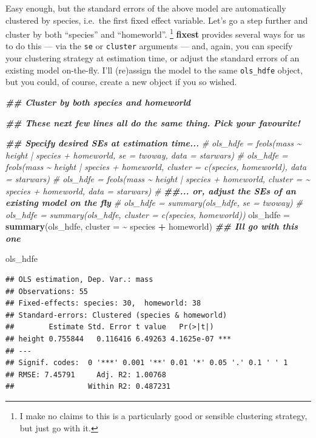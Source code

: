 \documentclass[
]{article}
\newenvironment{Shaded}{\begin{snugshade}}{\end{snugshade}}
\newcommand{\AttributeTok}[1]{\textcolor[rgb]{0.13,0.29,0.53}{#1}}
\newcommand{\CommentTok}[1]{\textcolor[rgb]{0.56,0.35,0.01}{\textit{#1}}}
\newcommand{\DocumentationTok}[1]{\textcolor[rgb]{0.56,0.35,0.01}{\textbf{\textit{#1}}}}
\newcommand{\FunctionTok}[1]{\textcolor[rgb]{0.13,0.29,0.53}{\textbf{#1}}}
\newcommand{\NormalTok}[1]{#1}
\newcommand{\OtherTok}[1]{\textcolor[rgb]{0.56,0.35,0.01}{#1}}
\newcommand{\SpecialCharTok}[1]{\textcolor[rgb]{0.81,0.36,0.00}{\textbf{#1}}}
\begin{document}
Easy enough, but the standard errors of the above model are
automatically clustered by species, i.e.~the first fixed effect
variable. Let's go a step further and cluster by both ``species'' and
``homeworld''. \footnote{I make no claims to this is a particularly good
  or sensible clustering strategy, but just go with it.} \textbf{fixest}
provides several ways for us to do this --- via the \texttt{se} or
\texttt{cluster} arguments --- and, again, you can specify your
clustering strategy at estimation time, or adjust the standard errors of
an existing model on-the-fly. I'll (re)assign the model to the same
\texttt{ols\_hdfe} object, but you could, of course, create a new object
if you so wished.

\begin{Shaded}
\begin{Highlighting}[]
\DocumentationTok{\#\# Cluster by both species and homeworld}

\DocumentationTok{\#\# These next few lines all do the same thing. Pick your favourite!}

\DocumentationTok{\#\# Specify desired SEs at estimation time...}
\CommentTok{\# ols\_hdfe = feols(mass \textasciitilde{} height | species + homeworld, se = \textquotesingle{}twoway\textquotesingle{}, data = starwars)}
\CommentTok{\# ols\_hdfe = feols(mass \textasciitilde{} height | species + homeworld, cluster = c(\textquotesingle{}species\textquotesingle{}, \textquotesingle{}homeworld\textquotesingle{}), data = starwars)}
\CommentTok{\# ols\_hdfe = feols(mass \textasciitilde{} height | species + homeworld, cluster = \textasciitilde{} species + homeworld, data = starwars)}
\CommentTok{\# }
\DocumentationTok{\#\#... or, adjust the SEs of an existing model on the fly}
\CommentTok{\# ols\_hdfe = summary(ols\_hdfe, se = \textquotesingle{}twoway\textquotesingle{})}
\CommentTok{\# ols\_hdfe = summary(ols\_hdfe, cluster = c(\textquotesingle{}species\textquotesingle{}, \textquotesingle{}homeworld\textquotesingle{}))}
\NormalTok{ols\_hdfe }\OtherTok{=} \FunctionTok{summary}\NormalTok{(ols\_hdfe, }\AttributeTok{cluster =} \SpecialCharTok{\textasciitilde{}}\NormalTok{ species }\SpecialCharTok{+}\NormalTok{ homeworld) }\DocumentationTok{\#\# I\textquotesingle{}ll go with this one}

\NormalTok{ols\_hdfe}
\end{Highlighting}
\end{Shaded}

\begin{verbatim}
## OLS estimation, Dep. Var.: mass
## Observations: 55 
## Fixed-effects: species: 30,  homeworld: 38
## Standard-errors: Clustered (species & homeworld) 
##        Estimate Std. Error t value   Pr(>|t|)    
## height 0.755844   0.116416 6.49263 4.1625e-07 ***
## ---
## Signif. codes:  0 '***' 0.001 '**' 0.01 '*' 0.05 '.' 0.1 ' ' 1
## RMSE: 7.45791     Adj. R2: 1.00768 
##                 Within R2: 0.487231
\end{verbatim}
\end{document}
